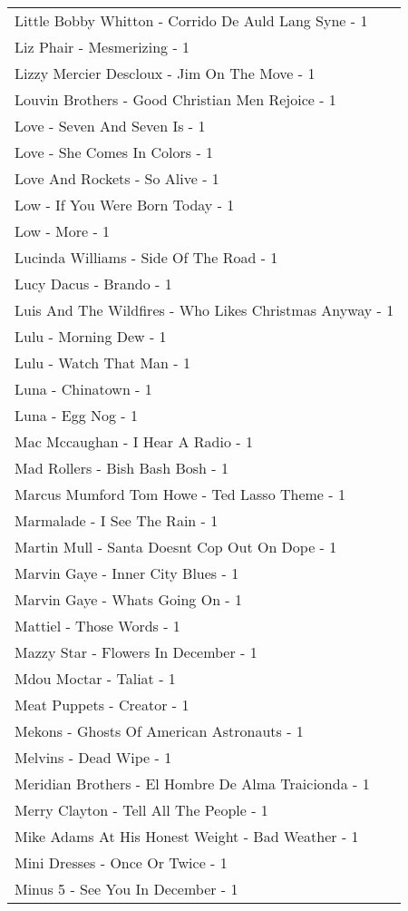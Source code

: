 \documentclass[
]{article}
\begin{document}
\begin{longtable}{l}
Little Bobby Whitton - Corrido De Auld Lang Syne - 1 \\ 
Liz Phair - Mesmerizing - 1 \\ 
Lizzy Mercier Descloux - Jim On The Move - 1 \\ 
Louvin Brothers - Good Christian Men Rejoice - 1 \\ 
Love - Seven And Seven Is - 1 \\ 
Love - She Comes In Colors - 1 \\ 
Love And Rockets - So Alive - 1 \\ 
Low - If You Were Born Today - 1 \\ 
Low - More - 1 \\ 
Lucinda Williams - Side Of The Road - 1 \\ 
Lucy Dacus - Brando - 1 \\ 
Luis And The Wildfires - Who Likes Christmas Anyway - 1 \\ 
Lulu - Morning Dew - 1 \\ 
Lulu - Watch That Man - 1 \\ 
Luna - Chinatown - 1 \\ 
Luna - Egg Nog - 1 \\ 
Mac Mccaughan - I Hear A Radio - 1 \\ 
Mad Rollers - Bish Bash Bosh - 1 \\ 
Marcus Mumford Tom Howe - Ted Lasso Theme - 1 \\ 
Marmalade - I See The Rain - 1 \\ 
Martin Mull - Santa Doesnt Cop Out On Dope - 1 \\ 
Marvin Gaye - Inner City Blues - 1 \\ 
Marvin Gaye - Whats Going On - 1 \\ 
Mattiel - Those Words - 1 \\ 
Mazzy Star - Flowers In December - 1 \\ 
Mdou Moctar - Taliat - 1 \\ 
Meat Puppets - Creator - 1 \\ 
Mekons - Ghosts Of American Astronauts - 1 \\ 
Melvins - Dead Wipe - 1 \\ 
Meridian Brothers - El Hombre De Alma Traicionda - 1 \\ 
Merry Clayton - Tell All The People - 1 \\ 
Mike Adams At His Honest Weight - Bad Weather - 1 \\ 
Mini Dresses - Once Or Twice - 1 \\ 
Minus 5 - See You In December - 1 \\ 

\end{longtable}
\end{document}
